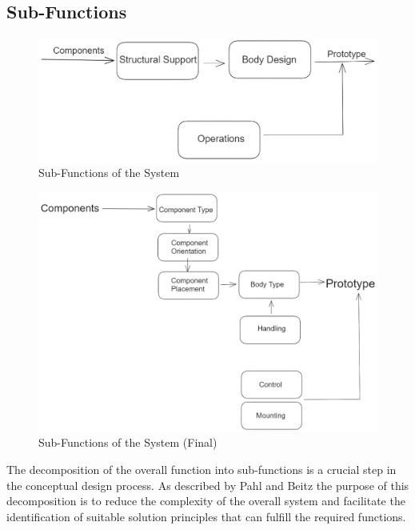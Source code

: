 \subsection{Sub-Functions}
\begin{figure}[ht!]
    \centering
    \includegraphics[width=\linewidth]{texs/Part1/chapter3/image/subfunction1.png}
    \caption{Sub-Functions of the System}
    \label{fig:sub-functions}
\end{figure}

\begin{figure}[ht!]
    \centering
    \includegraphics[width=\linewidth]{texs/Part1/chapter3/image/subfunction2.png}
    \caption{Sub-Functions of the System (Final)}
    \label{fig:sub-functions-final}
\end{figure}

The decomposition of the overall function into sub-functions is a crucial step in the conceptual design process. As described by Pahl and Beitz \cite{Pahl07r} the purpose of this decomposition is to reduce the complexity of the overall system and facilitate the identification of suitable solution principles that can fulfill the required functions.

